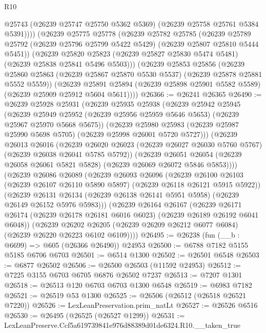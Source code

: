 \begin{lexlean}{R10}
\begin{coremodule}
          @25743
          (@26239 @25747 @25750 @5362 @5369)
          (@26239 @25758 @25761 @5384 @5391))))
    (@26239
      @25775
      @25778
      (@26239
        @25782
        @25785
        (@26239 @25789 @25792 (@26239 @25796 @25799 @5422 @5429) (@26239 @25807 @25810 @5444 @5451))
        (@26239
          @25820
          @25823
          (@26239 @25827 @25830 @5474 @5481)
          (@26239 @25838 @25841 @5496 @5503)))
      (@26239
        @25853
        @25856
        (@26239 @25860 @25863 (@26239 @25867 @25870 @5530 @5537) (@26239 @25878 @25881 @5552 @5559))
        (@26239
          @25891
          @25894
          (@26239 @25898 @25901 @5582 @5589)
          (@26239 @25909 @25912 @5604 @5611))))
@26366 := @26241 @26365
@26490 := @26239
    @25928
    @25931
    (@26239
      @25935
      @25938
      (@26239
        @25942
        @25945
        (@26239 @25949 @25952 (@26239 @25956 @25959 @5646 @5653) (@26239 @25967 @25970 @5668 @5675))
        (@26239
          @25980
          @25983
          (@26239 @25987 @25990 @5698 @5705)
          (@26239 @25998 @26001 @5720 @5727)))
      (@26239
        @26013
        @26016
        (@26239 @26020 @26023 (@26239 @26027 @26030 @5760 @5767) (@26239 @26038 @26041 @5785 @5792))
        (@26239
          @26051
          @26054
          (@26239 @26058 @26061 @5821 @5828)
          (@26239 @26069 @26072 @5846 @5853))))
    (@26239
      @26086
      @26089
      (@26239
        @26093
        @26096
        (@26239 @26100 @26103 (@26239 @26107 @26110 @5890 @5897) (@26239 @26118 @26121 @5915 @5922))
        (@26239
          @26131
          @26134
          (@26239 @26138 @26141 @5951 @5958)
          (@26239 @26149 @26152 @5976 @5983)))
      (@26239
        @26164
        @26167
        (@26239 @26171 @26174 (@26239 @26178 @26181 @6016 @6023) (@26239 @26189 @26192 @6041 @6048))
        (@26239
          @26202
          @26205
          (@26239 @26209 @26212 @6077 @6084)
          (@26239 @26220 @26223 @6102 @6109))))
@26495 := @26238 (fun (__b : @6699) => @605 (@26366 @26490)) @24953
@26500 := @6788 @7182 @5155 @5185 @6706 @6703
@26501 := @6514 @1300
@26502 := @26501 @6548
@26503 := @6877 @26502
@26506 := @26500 @26503 (@11592 @24953)
@26512 := @7225 @3155 @6703 @6705 @6876 @26502 @7237
@26513 := @7207 @1301
@26518 := @26513 @120 @6703 @6703 @1300 @6548
@26519 := @6983 @7182
@26521 := @26519 @53 @1300
@26525 := @26506 (@26512 (@26518 @26521 @7220))
@26526 := LexLeanPreservation.prim_natLt
@26527 := @26526 @6516
@26530 := @26495 (@26525 (@26527 @1299))
@26531 := LexLeanPreserve.Ccf5a619739841e976d88389d01de6324.R10.__taken_true

\end{coremodule}
\end{lexlean}
